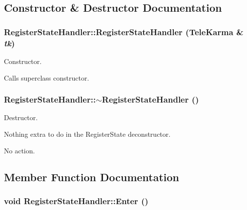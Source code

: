 \subsection{Constructor \& Destructor Documentation}
\hypertarget{classRegisterStateHandler_146b015654e6136dbc7b183630f51b2b}{
\subsubsection[{RegisterStateHandler}]{\setlength{\rightskip}{0pt plus 5cm}RegisterStateHandler::RegisterStateHandler ({\bf TeleKarma} \& {\em tk})}}
\label{classRegisterStateHandler_146b015654e6136dbc7b183630f51b2b}


Constructor. 

Calls superclass constructor. \hypertarget{classRegisterStateHandler_50abd4cf05e90e206662b94b8eb9e657}{
\subsubsection[{$\sim$RegisterStateHandler}]{\setlength{\rightskip}{0pt plus 5cm}RegisterStateHandler::$\sim$RegisterStateHandler ()}}
\label{classRegisterStateHandler_50abd4cf05e90e206662b94b8eb9e657}


Destructor. 

Nothing extra to do in the RegisterState deconstructor.

No action.

\subsection{Member Function Documentation}
\hypertarget{classRegisterStateHandler_ce5bc429d43d18e9233f521c2edf930a}{
\subsubsection[{Enter}]{\setlength{\rightskip}{0pt plus 5cm}void RegisterStateHandler::Enter ()}}
\label{classRegisterStateHandler_ce5bc429d43d18e9233f521c2edf930a}


